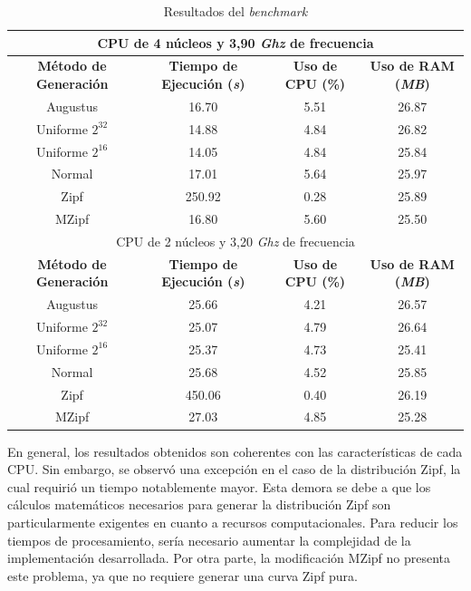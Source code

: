 \documentclass[12pt]{article}
\begin{document}
\begin{table}[ht]
	\centering
	\begin{tabular}{|c|c|c|c|}
		\hline
		\multicolumn{4}{|c|}{CPU de 4 núcleos y 3,90 \textit{Ghz} de frecuencia} \\
		\hline
		\textbf{Método de Generación} & \textbf{Tiempo de Ejecución (\textit{s})} & \textbf{Uso de CPU (\%)} & \textbf{Uso de RAM (\textit{MB})} \\
		\hline
		Augustus 			& 16.70  & 5.51 & 26.87 \\
		Uniforme $2^{32}$	& 14.88  & 4.84 & 26.82 \\
		Uniforme $2^{16}$	& 14.05  & 4.84 & 25.84 \\
		Normal 				& 17.01  & 5.64 & 25.97 \\
		Zipf   				& 250.92 & 0.28 & 25.89 \\
		MZipf  				& 16.80  & 5.60 & 25.50 \\
		\hline
		\multicolumn{4}{|c|}{CPU de 2 núcleos y 3,20 \textit{Ghz} de frecuencia} \\
		\hline
		\textbf{Método de Generación} & \textbf{Tiempo de Ejecución (\textit{s})} & \textbf{Uso de CPU (\%)} & \textbf{Uso de RAM (\textit{MB})} \\
		\hline
		Augustus 			& 25.66	 & 4.21 & 26.57 \\
		Uniforme $2^{32}$ 	& 25.07	 & 4.79 & 26.64 \\
		Uniforme $2^{16}$ 	& 25.37	 & 4.73 & 25.41 \\
		Normal 				& 25.68	 & 4.52 & 25.85 \\
		Zipf   				& 450.06 & 0.40 & 26.19 \\
		MZipf  				& 27.03	 & 4.85 & 25.28 \\
		\hline
	\end{tabular}
	\caption{Resultados del \textit{benchmark}}
\end{table}

En general, los resultados obtenidos son coherentes con las características de cada CPU. Sin embargo, se observó una excepción en el caso de la distribución Zipf, la cual requirió un tiempo notablemente mayor. Esta demora se debe a que los cálculos matemáticos necesarios para generar la distribución Zipf son particularmente exigentes en cuanto a recursos computacionales. Para reducir los tiempos de procesamiento, sería necesario aumentar la complejidad de la implementación desarrollada. Por otra parte, la modificación MZipf no presenta este problema, ya que no requiere generar una curva Zipf pura.
%
\vspace{-5pt}
\printbibliography
\end{document}

